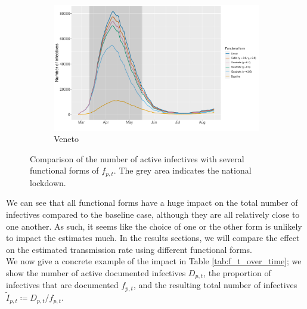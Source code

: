 \documentclass[12pt]{article}
\begin{document}
    \begin{figure}[H]\ContinuedFloat
	    \begin{subfigure}{\textwidth}
	      \centering
	      \includegraphics[width=0.95\linewidth]{output/undocumented_comparison_VEN.pdf}
	      \caption{Veneto}
	      \label{fig:undoc_VEN}
	    \end{subfigure}
	    \caption{Comparison of the number of active infectives with several functional forms of $f_{p,t}$. The grey area indicates the national lockdown.}
	    \label{fig:undoc_absolute}
    \end{figure}
	
	We can see that all functional forms have a huge impact on the total number of infectives compared to the baseline case, although they are all relatively close to one another. As such, it seems like the choice of one or the other form is unlikely to impact the estimates much. In the results sections, we will compare the effect on the estimated transmission rate using different functional forms.
	\\
	
	We now give a concrete example of the impact in Table \ref{tab:f_t_over_time}; we show the number of active documented infectives $D_{p,t}$, the proportion of infectives that are documented $f_{p,t}$, and the resulting total number of infectives $\tilde{I}_{p,t} \coloneqq D_{p,t} / f_{p,t}$.
	
\end{document}

